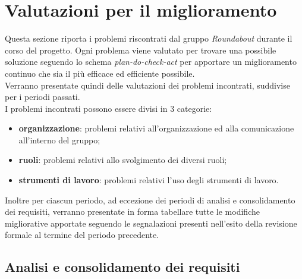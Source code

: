 \section{Valutazioni per il miglioramento}
	Questa sezione riporta i problemi riscontrati dal gruppo \textit{Roundabout} durante il corso del progetto. Ogni problema viene valutato per trovare una possibile soluzione seguendo lo schema \textit{plan-do-check-act} per apportare un miglioramento continuo che sia il più efficace ed efficiente possibile. \\
	Verranno presentate quindi delle valutazioni dei problemi incontrati, suddivise per i periodi passati. \\
		I problemi incontrati possono essere divisi in 3 categorie:
		\begin{itemize}
			\item \textbf{organizzazione}: problemi relativi all'organizzazione ed alla comunicazione all'interno del gruppo;
			\item \textbf{ruoli}: problemi relativi allo svolgimento dei diversi ruoli;
			\item \textbf{strumenti di lavoro}: problemi relativi l'uso degli strumenti di lavoro.
		\end{itemize}
	Inoltre per ciascun periodo, ad eccezione dei periodi di analisi e consolidamento dei requisiti, verranno presentate in forma tabellare tutte le modifiche migliorative apportate seguendo le segnalazioni presenti nell'esito della revisione formale al termine del periodo precedente.
	

	\subsection{Analisi e consolidamento dei requisiti}
	
